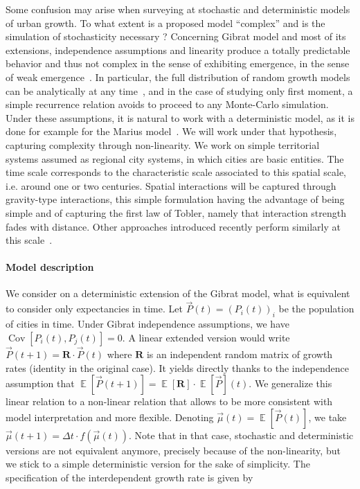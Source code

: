 \documentclass[Royal,sageh,times]{sagej}
\DeclareMathOperator{\Cov}{Cov}
\DeclareMathOperator{\E}{\mathbb{E}}
\newcommand{\Covb}[2]{\ensuremath{\Cov\!\left[#1,#2\right]}}
\newcommand{\Eb}[1]{\ensuremath{\E\!\left[#1\right]}}
\begin{document}
Some confusion may arise when surveying at stochastic and deterministic models of urban growth. To what extent is a proposed model ``complex'' and is the simulation of stochasticity necessary ? Concerning Gibrat model and most of its extensions, independence assumptions and linearity produce a totally predictable behavior and thus not complex in the sense of exhibiting emergence, in the sense of weak emergence~\citep{bedau2002downward}. In particular, the full distribution of random growth models can be analytically at any time~\cite{gabaix1999zipf}, and in the case of studying only first moment, a simple recurrence relation avoids to proceed to any Monte-Carlo simulation. Under these assumptions, it is natural to work with a deterministic model, as it is done for example for the Marius model~\cite{cottineau2014evolution}. We will work under that hypothesis, capturing complexity through non-linearity. We work on simple territorial systems assumed as regional city systems, in which cities are basic entities. The time scale corresponds to the characteristic scale associated to this spatial scale, i.e. around one or two centuries. Spatial interactions will be captured through gravity-type interactions, this simple formulation having the advantage of being simple and of capturing the first law of Tobler, namely that interaction strength fades with distance. Other approaches introduced recently perform similarly at this scale~\citep{masucci2013gravity}.


\paragraph{Model description}

We  consider on a deterministic extension of the Gibrat model, what is equivalent to consider only expectancies in time. Let $\vec{P}(t)=(P_i(t))_i$ be the population of cities in time. Under Gibrat independence assumptions, we have $\Covb{P_i(t)}{P_j(t)}=0$. A linear extended version would write $\vec{P}(t+1)=\mathbf{R}\cdot \vec{P}(t)$ where $\mathbf{R}$ is an independent random matrix of growth rates (identity in the original case). It yields directly thanks to the independence assumption that $\Eb{\vec{P}(t+1)}=\Eb{\mathbf{R}}\cdot\Eb{\vec{P}}(t)$. We generalize this linear relation to a non-linear relation that allows to be more consistent with model interpretation and more flexible. Denoting $\vec{\mu}(t)=\Eb{\vec{P}(t)}$, we take $\vec{\mu}(t+1)=\Delta t\cdot f(\vec{\mu}(t))$. Note that in that case, stochastic and deterministic versions are not equivalent anymore, precisely because of the non-linearity, but we stick to a simple deterministic version for the sake of simplicity. The specification of the interdependent growth rate is given by
\end{document}
